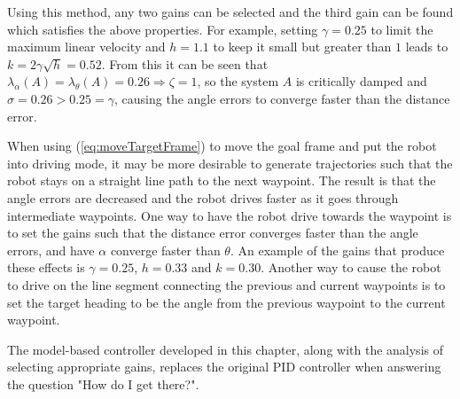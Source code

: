 Using this method, any two gains can be selected and the third gain can be found which satisfies the above properties. For example, setting $\gamma=0.25$ to limit the maximum linear velocity and $h=1.1$ to keep it small but greater than $1$ leads to $k=2\gamma\sqrt{h}=0.52$. From this it can be seen that $\lambda_\alpha(A) = \lambda_\theta(A) = 0.26 \Rightarrow \zeta = 1$, so the system $A$ is critically damped and $\sigma = 0.26>0.25=\gamma$, causing the angle errors to converge faster than the distance error.

When using (\ref{eq:moveTargetFrame}) to move the goal frame and put the robot into driving mode, it may be more desirable to generate trajectories such that the robot stays on a straight line path to the next waypoint. The result is that the angle errors are decreased and the robot drives faster as it goes through intermediate waypoints. One way to have the robot drive towards the waypoint is to set the gains such that the distance error converges faster than the angle errors, and have $\alpha$ converge faster than $\theta$. An example of the gains that produce these effects is $\gamma=0.25$, $h=0.33$ and $k=0.30$. Another way to cause the robot to drive on the line segment connecting the previous and current waypoints is to set the target heading to be the angle from the previous waypoint to the current waypoint.

The model-based controller developed in this chapter, along with the analysis of selecting appropriate gains, replaces the original PID controller when answering the question "How do I get there?".
